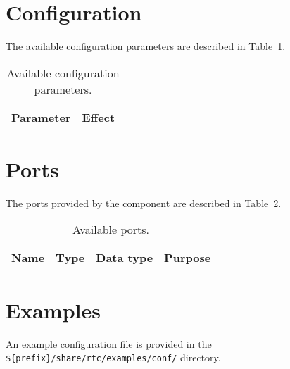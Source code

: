 \documentclass[a4paper,10pt]{article}
\begin{document}
\section{Configuration}
\label{sec:configuration}

The available configuration parameters are described in
Table~\ref{tab:config_params}.

\begin{table}[t]
  \centering
  \begin{tabularx}{\columnwidth}{lX}
    \toprule
    Parameter & Effect \\
    \midrule
    \bottomrule
  \end{tabularx}
  \caption{Available configuration parameters.}
  \label{tab:config_params}
\end{table}

\section{Ports}
\label{sec:port}

The ports provided by the component are described in Table~\ref{tab:ports}.

\begin{table}[t]
  \centering
  \begin{tabularx}{\columnwidth}{lllX}
    \toprule
    Name & Type & Data type & Purpose \\
    \midrule
    \bottomrule
  \end{tabularx}
  \caption{Available ports.}
  \label{tab:ports}
\end{table}

\section{Examples}
\label{sec:examples}

An example configuration file is provided in the
\verb|${prefix}/share/rtc/examples/conf/| directory.

\end{document}
